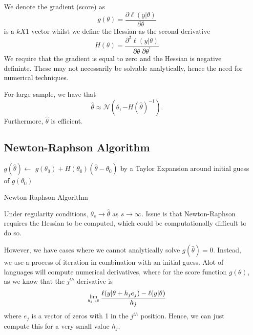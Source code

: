 \documentclass[twoside]{article}
\newcommand{\Lim}[1]{\raisebox{0.5ex}{\scalebox{0.8}{$\displaystyle \lim_{#1}\;$}}}
\begin{document}
We denote the gradient (score) as
$$
g(\theta) = \frac{\partial \ell (y|\theta)}{\partial \theta}
$$
is a $k X 1$ vector whilst we define the Hessian as the second derivative
$$
H(\theta) = \frac{\partial^2 \ell (y|\theta)}{\partial \theta \; \partial \theta^'}
$$
We require that the gradient is equal to zero and the Hessian is negative defininte. These may not necessarily be solvable analytically, hence the need for numerical techniques.

For large sample, we have that
$$
\hat{\theta} \approx \mathcal{N}(\theta, -H(\hat{\theta})^{-1}).
$$
Furthermore, $\hat{\theta}$ is efficient. 

\subsection{Newton-Raphson Algorithm}

\begin{algorithm}
\DontPrintSemicolon
{}

$g(\hat{\theta}) \gets$ $g(\theta_0) + H(\theta_0)(\hat{\theta} - \theta_0)$ by a Taylor Expansion around initial guess of $g(\theta_0)$



\caption{{\sc Newton-Raphson Algorithm}}
\label{algo:duplicate}
\end{algorithm}

Under regularity conditions, $\theta_s \rightarrow \hat{\theta}$ as $s \rightarrow \infty$. Issue is that Newton-Raphson requires the Hessian to be computed, which could be computationally difficult to do so.

However, we have cases where we cannot analytically solve $g(\hat{\theta}) = 0$. Instead, we use a process of iteration in combination with an initial guess. Alot of languages will compute numerical derivatives, where for the score function $g(\theta)$, as we know that the $j^{th}$ derivative is
$$
\Lim{h_j \rightarrow 0}\frac{\ell(y|\theta + h_je_j) - \ell(y|\theta)}{h_j}
$$
where $e_j$ is a vector of zeros with 1 in the $j^{th}$ position. Hence, we can just compute this for a very small value $h_j$.
\end{document}
